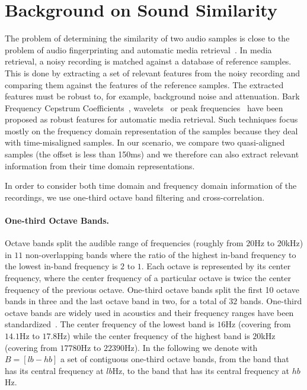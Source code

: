 \section{Background on Sound Similarity}
\label{sec:ps_sp_background}
The problem of determining the similarity of two audio samples is close to the problem of audio fingerprinting and automatic media retrieval~\cite{chandrasekhar11ismir}.
In media retrieval, a noisy recording is matched against a database of reference samples.
This is done by extracting a set of relevant features from the noisy recording and comparing them against the features of the reference samples.
The extracted features must be robust to, for example, background noise and attenuation.
Bark Frequency Cepstrum Coefficients~\cite{haitsma02}, wavelets~\cite{baluja08pr} or peak frequencies~\cite{Wang06cacm} have been proposed as robust features for automatic media retrieval.
Such techniques focus mostly on the frequency domain representation of the samples because they deal with time-misaligned samples.
In our scenario, we compare two quasi-aligned samples (the offset is less than 150ms) and we therefore can also extract relevant information from their time domain representations.

In order to consider both time domain and frequency domain information of the recordings, we use one-third octave band filtering and cross-correlation.

\paragraph{One-third Octave Bands.}
Octave bands split the audible range of frequencies (roughly from $20$Hz to $20$kHz) in $11$ non-overlapping bands where the ratio
of the highest in-band frequency to the lowest in-band frequency is $2$ to $1$.
Each octave is represented by its center frequency, where the center frequency of a particular octave is twice the center frequency of the previous octave.
One-third octave bands split the first 10 octave bands in three and the last octave band in two, for a total of $32$ bands.
One-third octave bands are widely used in acoustics and their frequency ranges have been standardized~\cite{ansi}.
The center frequency of the lowest band is $16$Hz (covering from $14.1$Hz to $17.8$Hz) while the center frequency of the highest band is $20$kHz (covering from $17780$Hz to $22390$Hz).
In the following we denote with $B=[lb-hb]$ a set of contiguous one-third octave bands, from the band that has its central frequency at $lb$Hz,
to the band that has its central frequency at $hb$Hz.

